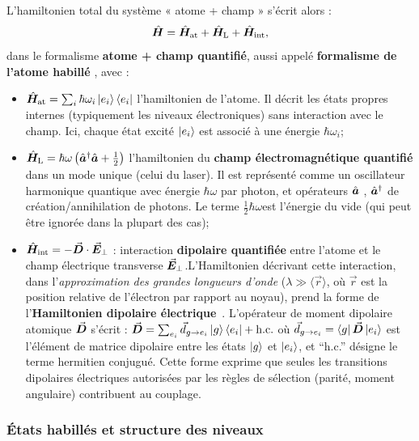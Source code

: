 L’hamiltonien total du système « atome + champ » s’écrit alors :
\[
\hat{\bm{H}} = \hat{\bm{H}}_{\mathrm{at}} + \hat{\bm{H}}_{\mathrm{L}} + \hat{\bm{H}}_{\mathrm{int}},
\]
dans le formalisme {\bf atome + champ quantifié}, aussi appelé {\bf formalisme de l’atome habillé} , avec :
\begin{itemize}[label = $\bullet$]
	\item \(\hat{\bm{H}}_{\mathrm{at}} = \sum_i \hbar \omega_i \ket{e_i}\bra{e_i} \) l’hamiltonien de l’atome. Il décrit les états propres internes (typiquement les niveaux électroniques) sans interaction avec le champ. Ici, chaque état excité $\ket{e_i}$ est associé à une énergie $\hbar \omega_i$;
	\item \(\hat{\bm{H}}_{\mathrm{L}} = \hbar \omega \left(\hat{\bm{a}}^\dagger \hat{\bm{a}} + \frac{1}{2}\right)\) l’hamiltonien du {\bf champ électromagnétique quantifié} dans un mode unique (celui du laser). Il est représenté comme un oscillateur harmonique quantique avec énergie $ \hbar \omega $  par photon, et opérateurs \( \hat{\bm{a}} \) , \( \hat{\bm{a}}^\dagger \) de création/annihilation de photons. Le terme $\tfrac12 \hbar \omega $est l’énergie du vide (qui peut être ignorée dans la plupart des cas);
	\item $\hat{\bm{H}}_{\mathrm{int}} = - \vec{{\bm{D}}} \cdot \vec{{\bm{E}}}_\perp$ : interaction \textbf{dipolaire quantifiée} entre l’atome et le champ électrique transverse $\vec{{\bm{E}}}_\perp$.L’Hamiltonien décrivant cette interaction, dans l’\textit{approximation des grandes longueurs d’onde} ($\lambda \gg \langle \vec{r} \rangle$, où $\vec{r}$ est la position relative de l’électron par rapport au noyau), prend la forme de l’\textbf{Hamiltonien dipolaire électrique}~\cite{CohenTannoudjiPhotonsAtomes, SteckRubidium87}. L’opérateur de moment dipolaire atomique $\vec{{\bm{D}}}$ s’écrit :
\(
\vec{{\bm{D}}} = \sum_{e_i} \vec{d}_{g \rightarrow e_i} \ket{g} \bra{e_i} + \text{h.c.}
\)
où $\vec{d}_{g \rightarrow e_i} = \bra{g} \vec{{\bm{D}}} \ket{e_i}$ est l’élément de matrice dipolaire entre les états $\ket{g}$ et $\ket{e_i}$, et ``h.c.'' désigne le terme hermitien conjugué. 
Cette forme exprime que seules les transitions dipolaires électriques autorisées par les règles de sélection (parité, moment angulaire) contribuent au couplage.

\end{itemize}


\subsubsection{États habillés et structure des niveaux}

